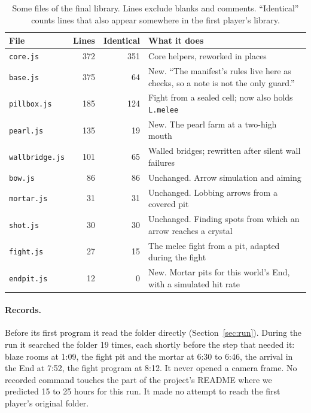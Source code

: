 \documentclass[11pt,a4paper]{article}
\begin{document}
\begin{table}[t]
  \caption{Some files of the final library. Lines exclude blanks and comments. ``Identical'' counts lines that also appear somewhere in the first player's library.}
  \label{tab:lib}
  \small
  \begin{tabularx}{\textwidth}{@{}lrrX@{}}
    \toprule
    \textbf{File} & \textbf{Lines} & \textbf{Identical} & \textbf{What it does} \\
    \midrule
    \texttt{core.js} & 372 & 351 & Core helpers, reworked in places \\
    \texttt{base.js} & 375 & 64 & New. ``The manifest's rules live here as checks, so a note is not the only guard.'' \\
    \texttt{pillbox.js} & 185 & 124 & Fight from a sealed cell; now also holds \texttt{L.melee} \\
    \texttt{pearl.js} & 135 & 19 & New. The pearl farm at a two-high mouth \\
    \texttt{wallbridge.js} & 101 & 65 & Walled bridges; rewritten after silent wall failures \\
    \texttt{bow.js} & 86 & 86 & Unchanged. Arrow simulation and aiming \\
    \texttt{mortar.js} & 31 & 31 & Unchanged. Lobbing arrows from a covered pit \\
    \texttt{shot.js} & 30 & 30 & Unchanged. Finding spots from which an arrow reaches a crystal \\
    \texttt{fight.js} & 27 & 15 & The melee fight from a pit, adapted during the fight \\
    \texttt{endpit.js} & 12 & 0 & New. Mortar pits for this world's End, with a simulated hit rate \\
    \bottomrule
  \end{tabularx}
\end{table}

\paragraph{Records.} Before its first program it read the folder directly (Section~\ref{sec:run}). During the run it searched the folder 19 times, each shortly before the step that needed it: blaze rooms at 1:09, the fight pit and the mortar at 6:30 to 6:46, the arrival in the End at 7:52, the fight program at 8:12. It never opened a camera frame. No recorded command touches the part of the project's README where we predicted 15 to 25 hours for this run. It made no attempt to reach the first player's original folder.
\end{document}
